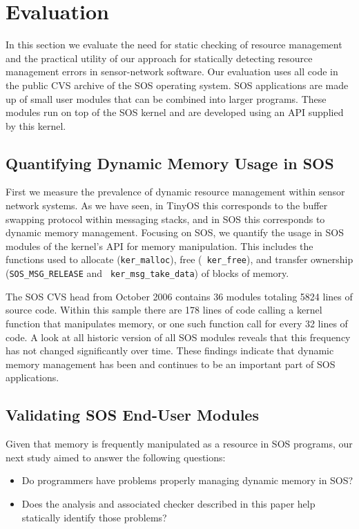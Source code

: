 \section{Evaluation}
\label{sec:eval}

In this section we evaluate the need for static checking of resource
management and the practical utility of our
approach for statically detecting resource management errors in
sensor-network software.  Our evaluation uses all code in the
public CVS archive of the SOS operating system.
SOS applications are made up of small
user modules that can be combined into larger programs.  These modules
run on top of the SOS kernel and are developed using an API
supplied by this kernel.


\subsection{Quantifying Dynamic Memory Usage in SOS}

First we measure the prevalence of dynamic resource management within
sensor network systems.  As we have seen, in TinyOS this 
corresponds to the buffer swapping protocol
within messaging stacks, and in SOS
this corresponds to dynamic memory management.
Focusing on SOS, we quantify the usage in SOS modules of the kernel's API for
memory manipulation.
This includes the 
functions used to allocate ({\tt ker\_malloc}), free ({\tt
  ker\_free}), 
and transfer ownership ({\tt SOS\_MSG\_RELEASE} and {\tt
  ker\_msg\_take\_data}) of blocks
of memory.  

The SOS CVS head from October 2006 contains 36 modules totaling 5824 lines
of source code.  Within this sample there are 178 lines of code
calling a kernel function that manipulates memory, or one such function call
for every 32 lines of code.  A look at all historic version of all
SOS modules reveals that this frequency has not changed significantly
over time.  These findings indicate that dynamic memory management has been
and continues to be an important part of SOS applications.


\subsection{Validating SOS End-User Modules}

Given that
memory is frequently manipulated as a resource in SOS programs, our
next study aimed to answer the following questions:
%
\begin{itemize}
%
\item Do programmers have problems properly managing dynamic memory in SOS?
%
\item Does the analysis and associated checker described in this paper
  help statically identify
those problems?
%
\end{itemize}

